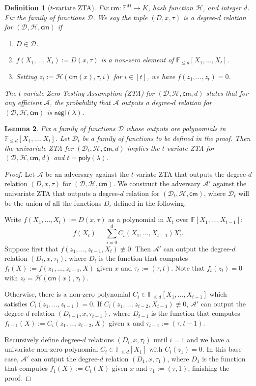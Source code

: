 \documentclass[11pt]{article} %
\newcommand{\F}{\ensuremath{\mathbb F}\xspace}
\newcommand{\adv}{\ensuremath{\mathcal A}\xspace}
\newcommand{\advprime}{\ensuremath{{\mathcal A}'}\xspace}
\newcommand{\cm}{\ensuremath{\mathsf{cm}}\xspace}
\newcommand{\negl}{\ensuremath{\mathsf{negl}(\lambda)}\xspace}
\newcommand{\defeq}{:=}
\newcommand{\hash}{\ensuremath{\mathcal{H}}\xspace}
\newtheorem{lemma}{Lemma}[section]
\newtheorem{dfn}[lemma]{Definition}
\newcommand{\poly}{\ensuremath{\mathsf{poly(\lambda)}}\xspace}
\newcommand{\ztafuncs}{\ensuremath{\mathcal{D}}\xspace}
\begin{document}
\begin{dfn}[$t$-variate ZTA]
Fix $\cm:\F^M\to K$, hash function \hash, and integer $d$. Fix the family of functions \ztafuncs.
We say the tuple $(D,x,\tau)$ is a \emph{degree-$d$ relation for $(\ztafuncs,\hash,\cm)$} if
\begin{enumerate}
 \item $D\in \ztafuncs$.
 \item $f(X_1,\ldots,X_t)\defeq D(x,\tau)$ is a non-zero element of $\F_{\leq d}[X_1,\ldots,X_t]$.
 \item Setting $z_i\defeq \hash(\cm(x),\tau,i)$ for $i\in[t]$, we have $f(z_1,\ldots,z_t)=0$.
\end{enumerate}
The $t$-variate Zero-Testing Assumption (ZTA) for $(\ztafuncs,\hash,\cm,d)$ states that for any efficient \adv, the probability that
\adv outputs a degree-$d$ relation for $(\ztafuncs,\hash,\cm)$ is \negl.
\end{dfn}

\begin{lemma}
Fix a family of functions \ztafuncs whose outputs are polynomials in $\F_{\leq d}[X_1,\ldots,X_t]$. Let $\ztafuncs_t$ be a family of functions to be defined in the proof. Then the univariate ZTA for $(\ztafuncs_t,\hash,\cm,d)$ implies the $t$-variate ZTA for $(\ztafuncs,\hash,\cm,d)$ and $t=\poly$.
\end{lemma}
\begin{proof}
Let \adv be an adversary against the $t$-variate ZTA that outputs the degree-$d$ relation $(D,x,\tau)$ for $(\ztafuncs,\hash,\cm)$. We construct the adversary \advprime against the univariate ZTA that outputs a degree-$d$ relation for $(\ztafuncs_t,\hash,\cm)$, where $\ztafuncs_t$ will be the union of all the functions $D_i$ defined in the following.

Write $f(X_1,\ldots,X_t)\defeq D(x,\tau)$ as a polynomial in $X_t$ over $\F[X_1,\ldots,X_{t-1}]$:
\[f(X_t)=\sum_{i=0}^d C_i(X_1,\ldots,X_{t-1}) X_t^i.\]
Suppose first that $f(z_1,\ldots,z_{t-1},X_t)\not\equiv 0$. Then \advprime can output the degree-$d$ relation $(D_t,x,\tau_t)$, where $D_t$ is the function that computes $f_t(X)\defeq f(z_1,\ldots,z_{t-1},X)$ given $x$ and $\tau_t\defeq(\tau,t)$. Note that $f_t(z_t)=0$ with $z_t=\hash(\cm(x),\tau_t)$.

Otherwise, there is a non-zero polynomial $C_i\in\F_{\leq d}[X_1,\ldots,X_{t-1}]$ which satisfies $C_i(z_1,\ldots,z_{t-1})=0$. If $C_i(z_1,\ldots,z_{t-2},X_{t-1})\not\equiv 0$, \advprime can output the degree-$d$ relation $(D_{t-1},x,\tau_{t-1})$, where $D_{t-1}$ is the function that computes $f_{t-1}(X)\defeq C_i(z_1,\ldots,z_{t-2},X)$ given $x$ and $\tau_{t-1}\defeq(\tau,t-1)$.

Recursively define degree-$d$ relations $(D_i,x,\tau_i)$ until $i=1$ and we have a univariate non-zero polynomial $C_i\in\F_{\leq d}[X_1]$ with $C_i(z_1)=0$. In this base case, \advprime can output the degree-$d$ relation $(D_1,x,\tau_1)$, where $D_1$ is the function that computes $f_1(X)\defeq C_i(X)$ given $x$ and $\tau_1\defeq(\tau,1)$, finishing the proof.
\end{proof}
\end{document}
